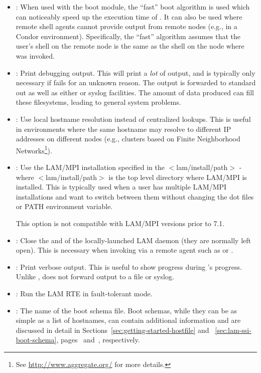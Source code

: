 \begin{itemize}
\item {}: When used with the  boot module, the
  ``fast'' boot algorithm is used which can noticeably speed up the
  execution time of .  It can also be used where remote
  shell agents cannot provide output from remote nodes (e.g., in a
  Condor environment).  Specifically, the ``fast'' algorithm assumes
  that the user's shell on the remote node is the same as the shell on
  the node where  was invoked.
  
\item {}: Print debugging output.  This will print a {\em
    lot} of output, and is typically only necessary if 
  fails for an unknown reason.  The output is forwarded to standard
  out as well as either  or syslog facilities.  The amount of
  data produced can fill these filesystems, leading to general system
  problems.

\item {}: Use local hostname resolution instead of
  centralized lookups.  This is useful in environments where the same
  hostname may resolve to different IP addresses on different nodes
  (e.g., clusters based on Finite Neighborhood Networks\footnote{See
    \url{http://www.aggregate.org/} for more details.}).
  

\item {}: Use the LAM/MPI
  installation specified in the $<$lam/install/path$>$ - where
  $<$lam/install/path$>$ is the top level directory where LAM/MPI is
  installed. This is typically used when a user has multiple LAM/MPI
  installations and want to switch between them without changing the
  dot files or PATH environment variable.
  
  This option is not compatible with LAM/MPI versions prior to 7.1.


\item {}: Close the  and  of the
  locally-launched LAM daemon (they are normally left open).  This is
  necessary when invoking  via a remote agent such as
   or .
  
\item {}: Print verbose output.  This is useful to show
  progress during 's progress.  Unlike ,
   does not forward output to a file or syslog.

\item {}: Run the LAM RTE in fault-tolerant mode.
  
\item {}: The name of the boot schema file.  Boot
  schemas, while they can be as simple as a list of hostnames, can
  contain additional information and are discussed in detail
  in Sections~\ref{sec:getting-started-hostfile} and
  ~\ref{sec:lam-ssi-boot-schema},
  pages~\pageref{sec:getting-started-hostfile}
  and~\pageref{sec:lam-ssi-boot-schema}, respectively.
\end{itemize}

